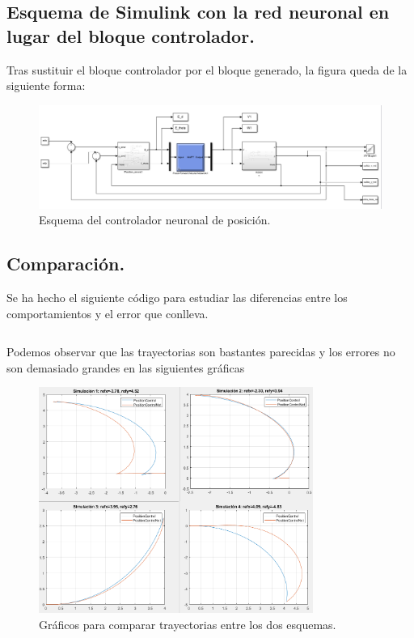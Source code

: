 \documentclass[a4paper, 12pt]{article}
\begin{document}
	\subsection{Esquema de Simulink con la red neuronal en lugar del bloque controlador.}
	Tras sustituir el bloque controlador por el bloque generado, la figura queda de la siguiente forma:
	\begin{figure}[htp!]
		\centering
		\includegraphics[width=1\textwidth]{figures/parte2/ejerH.png}
		\caption{Esquema del controlador neuronal de posición.}
	\end{figure}
	
	\newpage
	\subsection{Comparación.}
	Se ha hecho el siguiente código para estudiar las diferencias entre los comportamientos y el error que conlleva.
	\inputminted[fontsize=\scriptsize, linenos, breaklines=true, xleftmargin=0.75cm, frame=lines]{matlab}{code/parte2/compararComportamiento.m}
	\newpage
	Podemos observar que las trayectorias son bastantes parecidas y los  errores no son demasiado grandes en las siguientes gráficas
	\begin{figure}[htp!]
		\centering
		\includegraphics[width=0.8\textwidth]{figures/parte2/ejerI.png}
		\caption{Gráficos para comparar trayectorias entre los dos esquemas.}
	\end{figure}
	
\end{document}
